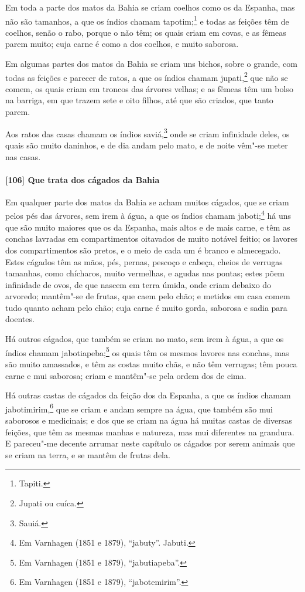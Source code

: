 \begin{linenumbers}
Em toda a parte dos matos da Bahia se criam coelhos como os da Espanha, mas não são
tamanhos, a que os índios chamam tapotim;\footnote{ Tapiti.} e todas as feições têm de
coelhos, senão o rabo, porque o não têm; os quais criam em covas, e as fêmeas parem muito;
cuja carne é como a dos coelhos, e muito saborosa.

Em algumas partes dos matos da Bahia se criam uns bichos, sobre o grande, com todas as
feições e parecer de ratos, a que os índios chamam jupati,\footnote{ Jupati ou cuíca.} que
não se comem, os quais criam em troncos das árvores velhas; e as fêmeas têm um bolso na
barriga, em que trazem sete e oito filhos, até que são criados, que tanto parem.

Aos ratos das casas chamam os índios saviá,\footnote{ Sauiá.} onde se criam infinidade
deles, os quais são muito daninhos, e de dia andam pelo mato, e de noite vêm"-se meter nas
casas.

\paragraph{[106] Que trata dos cágados da Bahia}\quad
Em qualquer parte dos matos da Bahia se acham muitos cágados, que se criam pelos pés das
árvores, sem irem à água, a que os índios chamam jaboti;\footnote{ Em Varnhagen (1851 e
1879), ``jabuty''. Jabuti.} há uns que são muito maiores que os da Espanha, mais altos e
de mais carne, e têm as conchas lavradas em compartimentos oitavados de muito notável
feitio; os lavores dos compartimentos são pretos, e o meio de cada um é branco e
almecegado. Estes cágados têm as mãos, pés, pernas, pescoço e cabeça, cheios de verrugas
tamanhas, como chícharos, muito vermelhas, e agudas nas pontas; estes põem infinidade de
ovos, de que nascem em terra úmida, onde criam debaixo do arvoredo; mantêm"-se de frutas,
que caem pelo chão; e metidos em casa comem tudo quanto acham pelo chão; cuja carne é
muito gorda, saborosa e sadia para doentes.

Há outros cágados, que também se criam no mato, sem irem à água, a que os índios chamam
jabotiapeba;\footnote{ Em Varnhagen (1851 e 1879), ``jabutiapeba''.} os quais têm os
mesmos lavores nas conchas, mas são muito amassados, e têm as costas muito chãs, e não têm
verrugas; têm pouca carne e mui saborosa; criam e mantêm"-se pela ordem dos de cima.

Há outras castas de cágados da feição dos da Espanha, a que os índios chamam
jabotimirim,\footnote{ Em Varnhagen (1851 e 1879), ``jabotemirim''.} que se criam e andam
sempre na água, que também são mui saborosos e medicinais; e dos que se criam na água há
muitas castas de diversas feições, que têm as mesmas manhas e natureza, mas mui diferentes
na grandura. E pareceu"-me decente arrumar neste capítulo os cágados por serem animais que
se criam na terra, e se mantêm de frutas dela.


\end{linenumbers}
